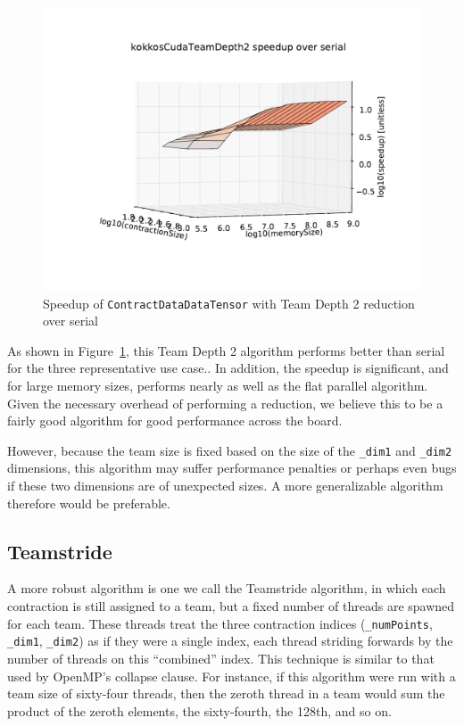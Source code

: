 \begin{figure}[ht]
    \includegraphics[scale=.55]{./VersusSerial_kokkosCudaTeamDepth2_clearCache_shadowfax}
    \caption[Performance of \texttt{ContractDataDataTensor} Team Depth
    2]{Speedup of \texttt{ContractDataDataTensor} with Team Depth 2 reduction
    over serial
\label{fig:ContractDataDataTensorDepth2}} 
\end{figure}

As shown in Figure~\ref{fig:ContractDataDataTensorDepth2}, this Team Depth 2
algorithm performs better than serial for the three representative use case..
In addition, the speedup is significant, and for large memory sizes, performs
nearly as well as the flat parallel algorithm.  Given the necessary overhead of
performing a reduction, we believe this to be a fairly good algorithm for good
performance across the
board.

However, because the team size is fixed based on the size of the \texttt{\_dim1}
and \texttt{\_dim2} dimensions, this algorithm may suffer performance penalties
or perhaps even bugs if these two dimensions are of unexpected sizes.  A more
generalizable algorithm therefore would be preferable.

\subsection{Teamstride}
    A more robust algorithm is one we call the Teamstride algorithm, in which
    each contraction is still assigned to a team, but a fixed number of threads
    are spawned for each team.  These threads treat the three contraction
    indices (\texttt{\_numPoints}, \texttt{\_dim1}, \texttt{\_dim2}) as if they were
    a single index, each thread striding forwards by the number of threads on
    this ``combined'' index.  This technique is similar to that used by OpenMP's
    collapse clause.  For instance, if this algorithm were run with a team size
    of sixty-four threads, then the zeroth thread in a team would sum the
    product of the zeroth elements, the sixty-fourth, the 128th, and so on.
    
